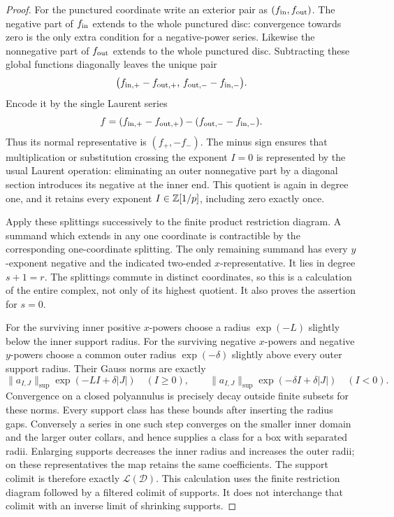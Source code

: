 \begin{proof}
For the punctured coordinate write an exterior pair as
$(f_{\rm in},f_{\rm out})$.  The negative part of $f_{\rm in}$ extends
to the whole punctured disc: convergence towards zero is the only
extra condition for a negative-power series.  Likewise the
nonnegative part of $f_{\rm out}$ extends to the whole punctured disc.
Subtracting these global functions diagonally leaves the unique pair
\[
 \bigl(f_{\rm in,+}-f_{\rm out,+},\,
       f_{\rm out,-}-f_{\rm in,-}\bigr).
\]
Encode it by the single Laurent series
\[
  f=(f_{\rm in,+}-f_{\rm out,+})
       -(f_{\rm out,-}-f_{\rm in,-}).
\]
Thus its normal representative is $(f_+,-f_-)$.  The minus sign
ensures that multiplication or substitution crossing the exponent
$I=0$ is represented by the usual Laurent operation: eliminating an
outer nonnegative part by a diagonal section introduces its negative
at the inner end.  This quotient is again in degree one, and it
retains every exponent $I\in\mathbb Z[1/p]$, including zero exactly once.

Apply these splittings successively to the finite product restriction
diagram.  A summand which extends in any one coordinate is
contractible by the corresponding one-coordinate splitting.  The only
remaining summand has every $y$-exponent negative and the indicated
two-ended $x$-representative.  It lies in degree $s+1=r$.
The splittings commute in distinct coordinates, so this is a
calculation of the entire complex, not only of its highest quotient.
It also proves the assertion for $s=0$.

For the surviving inner positive $x$-powers choose a radius
$\exp(-L)$ slightly below the inner support radius.  For the surviving
negative $x$-powers and negative $y$-powers choose a common outer
radius $\exp(-\delta)$ slightly above every outer support radius.
Their Gauss norms are exactly
\[
 \|a_{I,J}\|_{\sup}\exp(-LI+\delta|J|)
 \quad(I\geq0),\qquad
 \|a_{I,J}\|_{\sup}\exp(-\delta I+\delta|J|)
 \quad(I<0).
\]
Convergence on a closed polyannulus is precisely decay outside finite
subsets for these norms.  Every support class has these bounds after
inserting the radius gaps.  Conversely a series in one such step
converges on the smaller inner domain and the larger outer collars,
and hence supplies a class for a box with separated radii.  Enlarging
supports decreases the inner radius and increases the outer radii;
on these representatives the map retains the same coefficients.
The support colimit is therefore exactly $\mathscr L(\mathcal D)$.
This calculation uses the finite restriction diagram followed by a
filtered colimit of supports.  It does not interchange that colimit
with an inverse limit of shrinking supports.


\end{proof}
